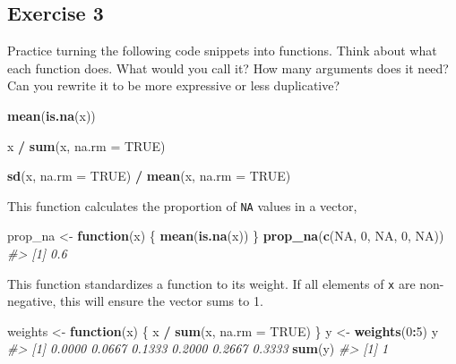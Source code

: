 \documentclass[]{book}
\newenvironment{Shaded}{\begin{snugshade}}{\end{snugshade}}
\newcommand{\CommentTok}[1]{\textcolor[rgb]{0.56,0.35,0.01}{\textit{#1}}}
\newcommand{\ControlFlowTok}[1]{\textcolor[rgb]{0.13,0.29,0.53}{\textbf{#1}}}
\newcommand{\DataTypeTok}[1]{\textcolor[rgb]{0.13,0.29,0.53}{#1}}
\newcommand{\DecValTok}[1]{\textcolor[rgb]{0.00,0.00,0.81}{#1}}
\newcommand{\KeywordTok}[1]{\textcolor[rgb]{0.13,0.29,0.53}{\textbf{#1}}}
\newcommand{\NormalTok}[1]{#1}
\newcommand{\OperatorTok}[1]{\textcolor[rgb]{0.81,0.36,0.00}{\textbf{#1}}}
\newcommand{\OtherTok}[1]{\textcolor[rgb]{0.56,0.35,0.01}{#1}}
\newcommand{\StringTok}[1]{\textcolor[rgb]{0.31,0.60,0.02}{#1}}
\theoremstyle{plain}
\theoremstyle{remark}
\theoremstyle{definition}
\theoremstyle{definition}
\theoremstyle{definition}
\theoremstyle{remark}
\begin{document}
\hypertarget{exercise-3-37}{%
\subsection{Exercise 3}\label{exercise-3-37}}

Practice turning the following code snippets into functions. Think about
what each function does. What would you call it? How many arguments does
it need? Can you rewrite it to be more expressive or less duplicative?

\begin{Shaded}
\begin{Highlighting}[]
\KeywordTok{mean}\NormalTok{(}\KeywordTok{is.na}\NormalTok{(x))}

\NormalTok{x }\OperatorTok{/}\StringTok{ }\KeywordTok{sum}\NormalTok{(x, }\DataTypeTok{na.rm =} \OtherTok{TRUE}\NormalTok{)}

\KeywordTok{sd}\NormalTok{(x, }\DataTypeTok{na.rm =} \OtherTok{TRUE}\NormalTok{) }\OperatorTok{/}\StringTok{ }\KeywordTok{mean}\NormalTok{(x, }\DataTypeTok{na.rm =} \OtherTok{TRUE}\NormalTok{)}
\end{Highlighting}
\end{Shaded}

This function calculates the proportion of \texttt{NA} values in a
vector,

\begin{Shaded}
\begin{Highlighting}[]
\NormalTok{prop_na <-}\StringTok{ }\ControlFlowTok{function}\NormalTok{(x) \{}
  \KeywordTok{mean}\NormalTok{(}\KeywordTok{is.na}\NormalTok{(x))}
\NormalTok{\}}
\KeywordTok{prop_na}\NormalTok{(}\KeywordTok{c}\NormalTok{(}\OtherTok{NA}\NormalTok{, }\DecValTok{0}\NormalTok{, }\OtherTok{NA}\NormalTok{, }\DecValTok{0}\NormalTok{, }\OtherTok{NA}\NormalTok{))}
\CommentTok{#> [1] 0.6}
\end{Highlighting}
\end{Shaded}

This function standardizes a function to its weight. If all elements of
\texttt{x} are non-negative, this will ensure the vector sums to 1.

\begin{Shaded}
\begin{Highlighting}[]
\NormalTok{weights <-}\StringTok{ }\ControlFlowTok{function}\NormalTok{(x) \{}
\NormalTok{  x }\OperatorTok{/}\StringTok{ }\KeywordTok{sum}\NormalTok{(x, }\DataTypeTok{na.rm =} \OtherTok{TRUE}\NormalTok{)}
\NormalTok{\}}
\NormalTok{y <-}\StringTok{ }\KeywordTok{weights}\NormalTok{(}\DecValTok{0}\OperatorTok{:}\DecValTok{5}\NormalTok{)}
\NormalTok{y}
\CommentTok{#> [1] 0.0000 0.0667 0.1333 0.2000 0.2667 0.3333}
\KeywordTok{sum}\NormalTok{(y)}
\CommentTok{#> [1] 1}
\end{Highlighting}
\end{Shaded}
\end{document}
